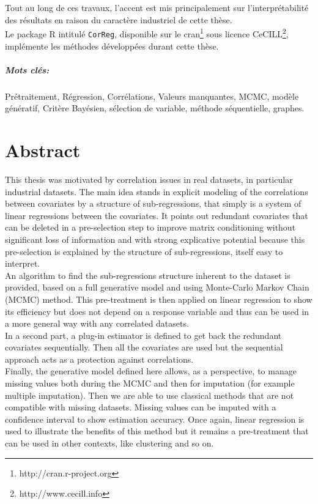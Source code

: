 \documentclass[12pt,a4paper]{report}
\begin{document}
	Tout au long de ces travaux, l'accent est mis principalement sur l'interprétabilité des résultats en raison du caractère industriel de cette thèse. 
\\	

	Le package R intitulé {\tt CorReg}, disponible sur le {\sc cran}\footnote{http://cran.r-project.org} sous licence CeCILL\footnote{http://www.cecill.info}, implémente les méthodes développées durant cette thèse.
	
\paragraph{Mots clés:}Prétraitement, Régression, Corrélations, Valeurs manquantes, MCMC, modèle génératif, Critère Bayésien, sélection de variable, méthode séquentielle, graphes.
\chapter*{Abstract}
	This thesis was motivated by correlation issues in real datasets, in particular industrial datasets. The main idea stands in explicit modeling of the correlations between covariates by a structure of sub-regressions, that simply is a system of linear regressions between the covariates. It points out redundant covariates that can be deleted in a pre-selection step to improve matrix conditioning without significant loss of information and with strong explicative potential because this pre-selection is explained by the structure of sub-regressions, itself easy to interpret.
	\\
	
	An algorithm to find the sub-regressions structure inherent to the dataset is provided, based on a full generative model and using Monte-Carlo Markov Chain (MCMC) method. This pre-treatment is then applied on linear regression to show its efficiency but does not depend on a response variable and thus can be used in a more general way with any correlated datasets.
	\\
	
	In a second part, a plug-in estimator is defined to get back the redundant covariates sequentially. Then all the covariates are used but the sequential approach acts as a protection against correlations.
\\

	Finally, the generative model defined here allows, as a perspective, to manage missing values both during the MCMC and then for imputation (for example multiple imputation). Then we are able to use classical methods that are not compatible with missing datasets. Missing values can be imputed with a confidence interval to show estimation accuracy. Once again, linear regression is used to illustrate the benefits of this method but it remains a pre-treatment that can be used in other contexts, like clustering and so on.
	\\ 
	
\end{document}
